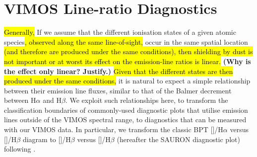 \documentclass[a4paper,fleqn,usenatbib]{mnras}
\DeclareRobustCommand{\removed}[1]{{\sethlcolor{red}\hl{#1}}}
\DeclareRobustCommand{\added}[1]{{\sethlcolor{green}\hl{#1}}}
\newcommand{\bracket}[1]{[#1]} %
\begin{document}





\appendix
\section{VIMOS Line-ratio Diagnostics}
\label{sec:Decrement}

% 
%

\removed{Generally, } If we assume that the different ionisation states of a
given atomic species\added{, observed along the same line-of-sight,} occur in 
the same spatial location \added{(and therefore are produced under the same 
conditions)}\removed{, then shielding by dust is not important or at worst its 
effect on the emission-line ratios is linear.} \textbf{(Why is the effect only 
linear? Justify.)} \removed{Given that the different states are then produced under
the same conditions,} it is natural to expect a simple relationship
between their emission line fluxes, similar to that of the Balmer
decrement between H$\alpha$ and H$\beta$. We exploit such
relationships here, to transform the classification boundaries of
commonly-used diagnostic plots that utilise emission lines outside of
the VIMOS spectral range, to diagnostics that can be measured with our
VIMOS data. In particular, we transform the classic BPT
[]/H$\alpha$ versus []/H$\beta$ diagram to
[]/H$\beta$ versus []/H$\beta$ (hereafter the
SAURON diagnostic plot) following \citet{Sarzi2010}.
\end{document}
